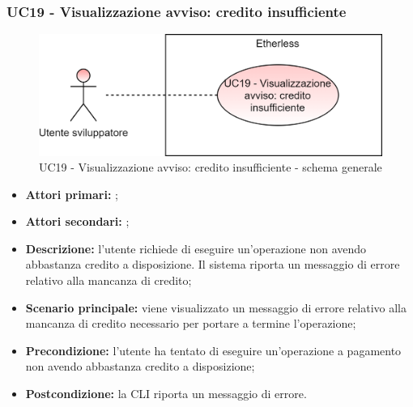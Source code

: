 \subsubsection{UC19 - Visualizzazione avviso: credito insufficiente}
\begin{figure}[h]
	\centering
	\includegraphics[scale=\ucs]{./res/img/UC19G.png}
	\caption {UC19 - Visualizzazione avviso: credito insufficiente - schema generale}
\end{figure}
\begin{itemize}
	\item \textbf{Attori primari:} \ua{};
	\item \textbf{Attori secondari:} \re{};
	\item \textbf{Descrizione:} l’utente richiede di eseguire un’operazione non avendo abbastanza credito a disposizione. Il sistema riporta un messaggio di errore relativo alla mancanza di credito; 
	\item \textbf{Scenario principale:} viene visualizzato un messaggio di errore relativo alla mancanza di credito necessario per portare a termine l’operazione;
	\item \textbf{Precondizione:} l’utente ha tentato di eseguire un’operazione a pagamento non avendo abbastanza credito a disposizione;  
	\item \textbf{Postcondizione:} la CLI riporta un messaggio di errore. 
\end{itemize}